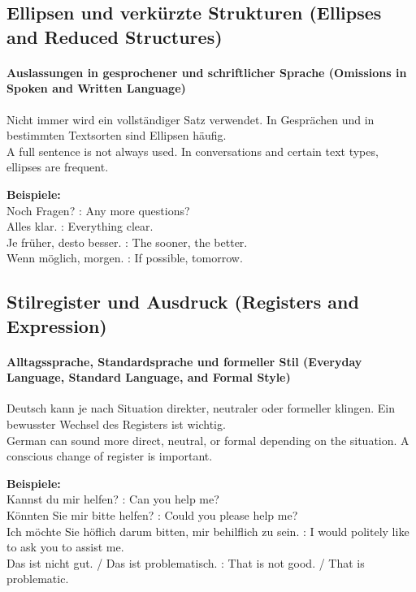 \documentclass[a4paper]{article}
\begin{document}
    \subsection{Ellipsen und verkürzte Strukturen {\small (Ellipses and Reduced Structures)}}
    
    \paragraph{Auslassungen in gesprochener und schriftlicher Sprache {\small (Omissions in Spoken and Written Language)}}
        Nicht immer wird ein vollständiger Satz verwendet. In Gesprächen und in bestimmten Textsorten sind Ellipsen häufig.\\
        A full sentence is not always used. In conversations and certain text types, ellipses are frequent.
        
        \textbf{Beispiele:}\\
        Noch Fragen? : Any more questions?\\
        Alles klar. : Everything clear.\\
        Je früher, desto besser. : The sooner, the better.\\
        Wenn möglich, morgen. : If possible, tomorrow.
    
    \subsection{Stilregister und Ausdruck {\small (Registers and Expression)}}
    
    \paragraph{Alltagssprache, Standardsprache und formeller Stil {\small (Everyday Language, Standard Language, and Formal Style)}}
        Deutsch kann je nach Situation direkter, neutraler oder formeller klingen. Ein bewusster Wechsel des Registers ist wichtig.\\
        German can sound more direct, neutral, or formal depending on the situation. A conscious change of register is important.
        
        \textbf{Beispiele:}\\
        Kannst du mir helfen? : Can you help me?\\
        Könnten Sie mir bitte helfen? : Could you please help me?\\
        Ich möchte Sie höflich darum bitten, mir behilflich zu sein. : I would politely like to ask you to assist me.\\
        Das ist nicht gut. / Das ist problematisch. : That is not good. / That is problematic.
\end{document}
